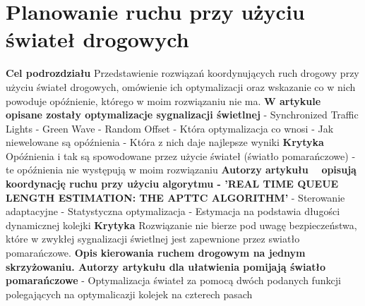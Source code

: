 \section{Planowanie ruchu przy użyciu świateł drogowych}

\textbf{Cel podrozdziału}
\newline
Przedstawienie rozwiązań koordynujących ruch drogowy przy użyciu świateł drogowych, omówienie ich optymalizacji oraz wskazanie co w nich powoduje opóźnienie, którego w moim rozwiązaniu nie ma.
\newline
\newline
\textbf{W artykule ~\cite{brockfeld2001optimizing} opisane zostały optymalizacje sygnalizacji świetlnej}
  \newline
  - Synchronized Traffic Lights
  \newline
  - Green Wave
  \newline
  - Random Offset
  \newline
  \newline
  - Która optymalizacja co wnosi
  \newline
  - Jak niewelowane są opóźnienia
  \newline
  - Która z nich daje najlepsze wyniki
  \newline
  \newline
\textbf{Krytyka}
\newline
Opóźnienia i tak są spowodowane przez użycie świateł (światło pomarańczowe) - te opóźnienia nie występują w moim rozwiązaniu
\newpage
\textbf{Autorzy artykułu ~\cite{athmaraman2005adaptive} opisują koordynację ruchu przy użyciu algorytmu - 'REAL TIME QUEUE LENGTH ESTIMATION: THE APTTC ALGORITHM'}
  \newline
  - Sterowanie adaptacyjne
  \newline
  - Statystyczna optymalizacja
  \newline
  - Estymacja na podstawia długości dynamicznej kolejki
\newline
\newline
\textbf{Krytyka}
\newline
Rozwiązanie nie bierze pod uwagę bezpieczeństwa, które w zwykłej sygnalizacji świetlnej jest zapewnione przez swiatło pomarańczowe.
\newline
\newline
\textbf{Opis kierowania ruchem drogowym na jednym skrzyżowaniu. Autorzy artykułu \cite{de1998optimal} dla ułatwienia pomijają światło pomarańczowe}
  \newline
  - Optymalizacja świateł za pomocą dwóch podanych funkcji polegających na optymalicazji kolejek na czterech pasach
